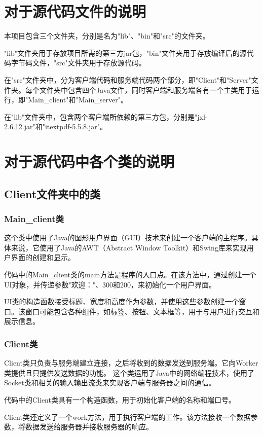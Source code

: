 \section{对于源代码文件的说明}
本项目包含三个文件夹，分别是名为"lib"、"bin"和"src"的文件夹。

"lib"文件夹用于存放项目所需的第三方jar包，"bin"文件夹用于存放编译后的源代码字节码文件，"src"文件夹用于存放源代码。

在"src"文件夹中，分为客户端代码和服务端代码两个部分，即"Client"和"Server"文件夹。每个文件夹中包含四个Java文件，同时客户端和服务端各有一个主类用于运行，即"Main\_client"和"Main\_server"。

在"lib"文件夹中，包含两个客户端所依赖的第三方包，分别是"jxl-2.6.12.jar"和"itextpdf-5.5.8.jar"。
\newpage
\section{对于源代码中各个类的说明}
\subsection{Client文件夹中的类}
\subsubsection{Main\_client类}
这个类中使用了Java的图形用户界面（GUI）技术来创建一个客户端的主程序。具体来说，它使用了Java的AWT（Abstract Window Toolkit）和Swing库来实现用户界面的创建和显示。

代码中的Main\_client类的main方法是程序的入口点。在该方法中，通过创建一个UI对象，并传递参数"欢迎："、300和200，来初始化一个用户界面。

UI类的构造函数接受标题、宽度和高度作为参数，并使用这些参数创建一个窗口。该窗口可能包含各种组件，如标签、按钮、文本框等，用于与用户进行交互和展示信息。

\subsubsection{Client类}
Client类只负责与服务端建立连接，之后将收到的数据发送到服务端。它向Worker类提供且只提供发送数据的功能。
这个类运用了Java中的网络编程技术，使用了Socket类和相关的输入输出流类来实现客户端与服务器之间的通信。

代码中的Client类具有一个构造函数，用于初始化客户端的名称和端口号。

Client类还定义了一个work方法，用于执行客户端的工作。该方法接收一个数据参数，将数据发送给服务器并接收服务器的响应。

